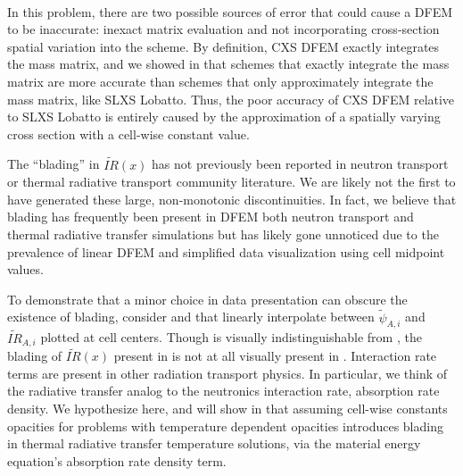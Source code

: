 %
%
\\
In this problem, there are two possible sources of error that could cause a DFEM to be inaccurate: inexact matrix evaluation and not incorporating cross-section spatial variation into the scheme.
By definition, CXS DFEM exactly integrates the mass matrix, and we showed in  that schemes that exactly integrate the mass matrix are more accurate than schemes that only approximately integrate the mass matrix, like SLXS Lobatto.
Thus, the poor accuracy of CXS DFEM relative to SLXS Lobatto is entirely caused by the approximation of a spatially varying cross section with a cell-wise constant value.

The ``blading'' in $\widetilde{IR}(x)$ has not previously been reported in neutron transport or thermal radiative transport community literature.
We are likely not the first to have generated these large, non-monotonic discontinuities. 
In fact, we believe that blading has frequently been present in DFEM both neutron transport and thermal radiative transfer simulations but has likely gone unnoticed due to the prevalence of linear DFEM and simplified data visualization using cell midpoint values.

To demonstrate that a minor choice in data presentation can obscure the existence of blading, consider  and  that linearly interpolate between $\widetilde{\psi}_{A,i}$ and  $\widetilde{IR}_{A,i}$ plotted at cell centers.
Though  is visually indistinguishable from , the blading of $\widetilde{IR}(x)$ present in  is not at all visually present in .
Interaction rate terms are present in other radiation transport physics.
In particular, we think of the radiative transfer analog to the neutronics interaction rate, absorption rate density.
We hypothesize here, and will show in  that assuming cell-wise constants opacities for problems with temperature dependent opacities introduces blading in thermal radiative transfer temperature solutions, via the material energy equation's absorption rate density term.
\vfill{}

